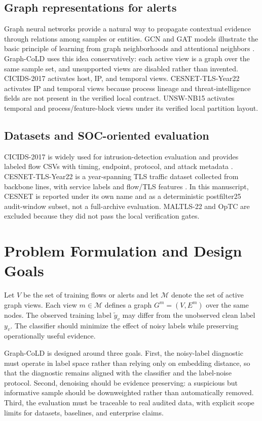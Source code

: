 \documentclass[preprint,review,12pt]{elsarticle}
\begin{document}
\subsection{Graph representations for alerts}
Graph neural networks provide a natural way to propagate contextual evidence
through relations among samples or entities. GCN and GAT models illustrate the
basic principle of learning from graph neighborhoods and attentional neighbors
\cite{kipf2017gcn,velickovic2018gat}. Graph-CoLD uses this idea conservatively:
each active view is a graph over the same sample set, and unsupported views are
disabled rather than invented. CICIDS-2017 activates host, IP, and temporal
views. CESNET-TLS-Year22 activates IP and temporal views because process lineage
and threat-intelligence fields are not present in the verified local contract.
UNSW-NB15 activates temporal and process/feature-block views under its verified
local partition layout.

\subsection{Datasets and SOC-oriented evaluation}
CICIDS-2017 is widely used for intrusion-detection evaluation and provides
labeled flow CSVs with timing, endpoint, protocol, and attack metadata
\cite{sharafaldin2018cicids}. CESNET-TLS-Year22 is a year-spanning TLS traffic
dataset collected from backbone lines, with service labels and flow/TLS features
\cite{hynek2024cesnettlsyear22,cesnettlsyear22}. In this manuscript, CESNET is
reported under its own name and as a deterministic postfilter25 audit-window
subset, not a full-archive evaluation. MALTLS-22 and OpTC are excluded because
they did not pass the local verification gates.

\section{Problem Formulation and Design Goals}
Let $V$ be the set of training flows or alerts and let
$\mathcal{M}$ denote the set of active graph views. Each view
$m\in\mathcal{M}$ defines a graph $G^m=(V,E^m)$ over the same nodes. The
observed training label $\tilde y_v$ may differ from the unobserved clean label
$y_v$. The classifier should minimize the effect of noisy labels while preserving
operationally useful evidence.

Graph-CoLD is designed around three goals. First, the noisy-label diagnostic must
operate in label space rather than relying only on embedding distance, so that
the diagnostic remains aligned with the classifier and the label-noise protocol.
Second, denoising should be evidence preserving: a suspicious but informative
sample should be downweighted rather than automatically removed. Third, the
evaluation must be traceable to real audited data, with explicit scope limits for
datasets, baselines, and enterprise claims.
\end{document}
